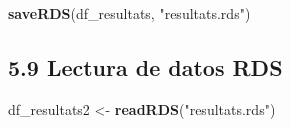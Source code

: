 \documentclass[
]{article}
\newenvironment{Shaded}{\begin{snugshade}}{\end{snugshade}}
\newcommand{\FunctionTok}[1]{\textcolor[rgb]{0.13,0.29,0.53}{\textbf{#1}}}
\newcommand{\NormalTok}[1]{#1}
\newcommand{\OtherTok}[1]{\textcolor[rgb]{0.56,0.35,0.01}{#1}}
\newcommand{\StringTok}[1]{\textcolor[rgb]{0.31,0.60,0.02}{#1}}
\begin{document}
\begin{Shaded}
\begin{Highlighting}[]
\FunctionTok{saveRDS}\NormalTok{(df\_resultats, }\StringTok{"resultats.rds"}\NormalTok{)}
\end{Highlighting}
\end{Shaded}

\hypertarget{lectura-de-datos-rds}{%
\subsection{5.9 Lectura de datos RDS}\label{lectura-de-datos-rds}}

\begin{Shaded}
\begin{Highlighting}[]
\NormalTok{df\_resultats2 }\OtherTok{\textless{}{-}} \FunctionTok{readRDS}\NormalTok{(}\StringTok{"resultats.rds"}\NormalTok{)}
\end{Highlighting}
\end{Shaded}
\end{document}
